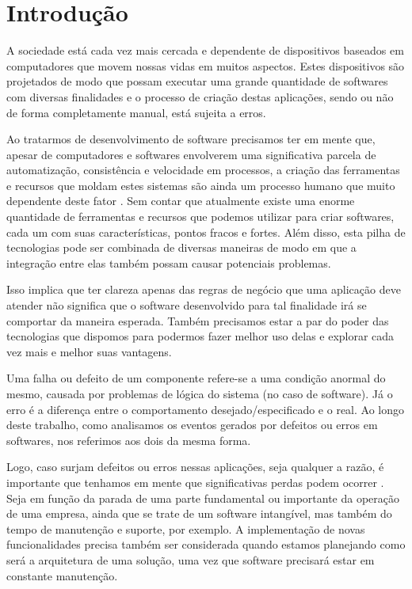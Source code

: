 \chapter{Introdução}\label{cap:introduction}

A sociedade está cada vez mais cercada e dependente de dispositivos baseados em computadores que movem nossas vidas em muitos aspectos. Estes dispositivos são projetados de modo que possam executar uma grande quantidade de softwares com diversas finalidades e o processo de criação destas aplicações, sendo ou não de forma completamente manual, está sujeita a erros.

Ao tratarmos de desenvolvimento de software precisamos ter em mente que, apesar de computadores e softwares envolverem uma significativa parcela de automatização, consistência e velocidade em processos, a criação das ferramentas e recursos que moldam estes sistemas são ainda um processo humano que muito dependente deste fator \cite{human_factor_on_software_engineering}. Sem contar que atualmente existe uma enorme quantidade de ferramentas e recursos que podemos utilizar para criar softwares, cada um com suas características, pontos fracos e fortes. Além disso, esta pilha de tecnologias pode ser combinada de diversas maneiras de modo em que a integração entre elas também possam causar potenciais problemas.

Isso implica que ter clareza apenas das regras de negócio que uma aplicação deve atender não significa que o software desenvolvido para tal finalidade irá se comportar da maneira esperada. Também precisamos estar a par do poder das tecnologias que dispomos para podermos fazer melhor uso delas e explorar cada vez mais e melhor suas vantagens.

Uma falha ou defeito de um componente refere-se a uma condição anormal do mesmo, causada por problemas de lógica do sistema (no caso de software). Já o erro é a diferença entre o comportamento desejado/especificado e o real\cite{sandhof2006defeitos}. Ao longo deste trabalho, como analisamos os eventos gerados por defeitos ou erros em softwares, nos referimos aos dois da mesma forma.

Logo, caso surjam defeitos ou erros nessas aplicações, seja qualquer a razão, é importante que tenhamos em mente que significativas perdas podem ocorrer \cite{prejuizos_com_softwares} \cite{facebook_lost_millions_during_outage}. Seja em função da parada de uma parte fundamental ou importante da operação de uma empresa, ainda que se trate de um software intangível, mas também do tempo de manutenção e suporte, por exemplo. A implementação de novas funcionalidades precisa também ser considerada quando estamos planejando como será a arquitetura de uma solução, uma vez que software precisará estar em constante manutenção.

